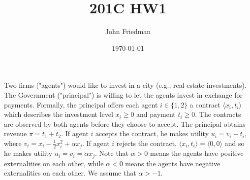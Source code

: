 \documentclass[answers]{exam}
\title{201C HW1}
\author{John Friedman}
\date{\today}
\begin{document}
\maketitle

\begin{questions}
    \question Two firms ("agents") would like to invest in a city (e.g., real estate investments). The Government ("principal") is willing to let the agents invest in exchange for payments. Formally, the principal offers each agent $i \in \{1, 2\}$ a contract $\langle x_i, t_i \rangle$ which describes the investment level $x_i \geq 0$ and payment $t_i \geq 0$. The contracts are observed by both agents before they choose to accept.
    The principal obtains revenue $\pi = t_1 + t_2$. If agent $i$ accepts the contract, he makes utility $u_i = v_i - t_i$, where $v_i = x_i - \frac{1}{2} x_i^2 + \alpha x_j$. If agent $i$ rejects the contract, $\langle x_i, t_i \rangle = \langle 0, 0 \rangle$ and so he makes utility $u_i = v_i = \alpha x_j$. Note that $\alpha > 0$ means the agents have positive externalities on each other, while $\alpha < 0$ means the agents have negative externalities on each other. We assume that $\alpha > -1$.
\end{questions}
\end{document}
